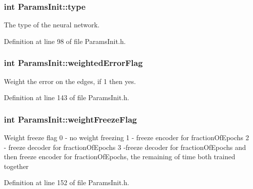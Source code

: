 \subsubsection[{\texorpdfstring{type}{type}}]{\setlength{\rightskip}{0pt plus 5cm}int Params\+Init\+::type}\hypertarget{classParamsInit_a717a075db2987b04c493a113fc6e85a5}{}\label{classParamsInit_a717a075db2987b04c493a113fc6e85a5}


The type of the neural network. 



Definition at line 98 of file Params\+Init.\+h.

\subsubsection[{\texorpdfstring{weighted\+Error\+Flag}{weightedErrorFlag}}]{\setlength{\rightskip}{0pt plus 5cm}int Params\+Init\+::weighted\+Error\+Flag}\hypertarget{classParamsInit_ac98a22ad5adfcef9d3ac4f56e25dc8ca}{}\label{classParamsInit_ac98a22ad5adfcef9d3ac4f56e25dc8ca}


Weight the error on the edges, if 1 then yes. 



Definition at line 143 of file Params\+Init.\+h.

\subsubsection[{\texorpdfstring{weight\+Freeze\+Flag}{weightFreezeFlag}}]{\setlength{\rightskip}{0pt plus 5cm}int Params\+Init\+::weight\+Freeze\+Flag}\hypertarget{classParamsInit_aac355778c92c0ea796fc29d329809624}{}\label{classParamsInit_aac355778c92c0ea796fc29d329809624}
Weight freeze flag 0 -\/ no weight freezing 1 -\/ freeze encoder for fraction\+Of\+Epochs 2 -\/ freeze decoder for fraction\+Of\+Epochs 3 -\/freeze decoder for fraction\+Of\+Epochs and then freeze encoder for fraction\+Of\+Epochs, the remaining of time both trained together 

Definition at line 152 of file Params\+Init.\+h.

